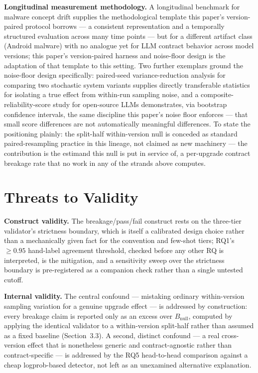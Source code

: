\documentclass[11pt]{article}
\begin{document}
\textbf{Longitudinal measurement methodology.} A longitudinal benchmark for malware concept drift \citep{LAMDA} supplies the methodological template this paper's version-paired protocol borrows --- a consistent representation and a temporally structured evaluation across many time points --- but for a different artifact class (Android malware) with no analogue yet for LLM contract behavior across model versions; this paper's version-paired harness and noise-floor design is the adaptation of that template to this setting. Two further exemplars ground the noise-floor design specifically: paired-seed variance-reduction analysis for comparing two stochastic system variants \citep{WhenDoesPairing4145} supplies directly transferable statistics for isolating a true effect from within-run sampling noise, and a composite-reliability-score study for open-source LLMs \citep{BeyondHallucinationsComposite4058} demonstrates, via bootstrap confidence intervals, the same discipline this paper's noise floor enforces --- that small score differences are not automatically meaningful differences. To state the positioning plainly: the split-half within-version null is conceded as standard paired-resampling practice in this lineage, not claimed as new machinery --- the contribution is the estimand this null is put in service of, a per-upgrade contract breakage rate that no work in any of the strands above computes.

\section{Threats to Validity}

\textbf{Construct validity.} The breakage/pass/fail construct rests on the three-tier validator's strictness boundary, which is itself a calibrated design choice rather than a mechanically given fact for the convention and few-shot tiers; RQ1's $\geq 0.95$ hand-label agreement threshold, checked before any other RQ is interpreted, is the mitigation, and a sensitivity sweep over the strictness boundary is pre-registered as a companion check rather than a single untested cutoff.

\textbf{Internal validity.} The central confound --- mistaking ordinary within-version sampling variation for a genuine upgrade effect --- is addressed by construction: every breakage claim is reported only as an excess over $B_{\text{null}}$, computed by applying the identical validator to a within-version split-half rather than assumed as a fixed baseline (Section~3.3). A second, distinct confound --- a real cross-version effect that is nonetheless generic and contract-agnostic rather than contract-specific --- is addressed by the RQ5 head-to-head comparison against a cheap logprob-based detector, not left as an unexamined alternative explanation.
\end{document}
